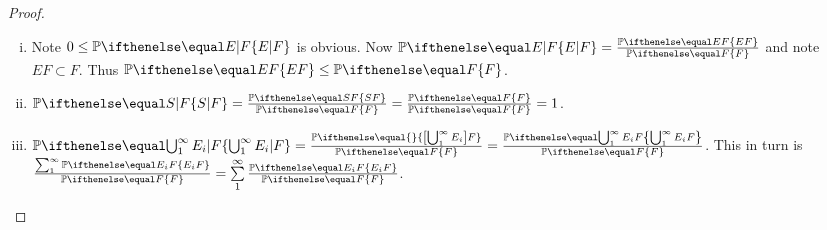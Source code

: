 \documentclass[a4paper,8pt]{article}
\begin{document}
\begin{outline}
    \begin{proof}
      \begin{enumerate}[i.]
        \item
          Note \(0 \leq \bbp[E|F]\) is obvious. Now \(\bbp[E|F] = \frac{\bbp[EF]}{\bbp[F]}\) and note
          \(EF \subset F\). Thus \(\bbp[EF] \leq \bbp[F]\).
        \item
          \(\bbp[S|F] = \frac{\bbp[SF]}{\bbp[F]} = \frac{\bbp[F]}{\bbp[F]} = 1\).
        \item
          \(\bbp[\bigcup_{1}^{\infty} E_i|F] = \frac{\bbp\{\left[\bigcup_{1}^{\infty} E_i\right]F\}}{\bbp[F]}
          = \frac{\bbp[\bigcup_{1}^{\infty}E_iF]}{\bbp[F]}\). This in turn is
          \(\frac{\sum_{1}^{\infty} \bbp[E_iF]}{\bbp[F]} = \sum\limits_{1}^{\infty} \frac{\bbp[E_iF]}{\bbp[F]}\).
      \end{enumerate}
    \end{proof}
\end{outline}
\end{document}
